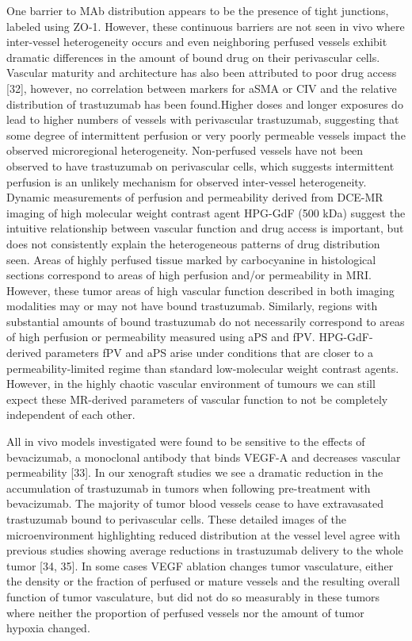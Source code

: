 One barrier to MAb distribution appears to be the presence of tight junctions, labeled using ZO-1.
However, these continuous barriers are not seen in vivo where inter-vessel heterogeneity occurs and even neighboring perfused vessels exhibit dramatic differences in the amount of bound drug on their perivascular cells.
Vascular maturity and architecture has also been attributed to poor drug access [32], however, no correlation between markers for aSMA or CIV and the relative distribution of trastuzumab has been found.Higher doses and longer exposures do lead to higher numbers of vessels with perivascular trastuzumab, suggesting that some degree of intermittent perfusion or very poorly permeable vessels impact the observed microregional heterogeneity.
Non-perfused vessels have not been observed to have trastuzumab on perivascular cells, which suggests intermittent perfusion is an unlikely mechanism for observed inter-vessel heterogeneity.
Dynamic measurements of perfusion and permeability derived from DCE-MR imaging of high molecular weight contrast agent HPG-GdF (500 kDa) suggest the intuitive relationship between vascular function and drug access is important, but does not consistently explain the heterogeneous patterns of drug distribution seen.
Areas of highly perfused tissue marked by carbocyanine in histological sections correspond to areas of high perfusion and/or permeability in MRI.
However, these tumor areas of high vascular function described in both imaging modalities may or may not have bound trastuzumab.
Similarly, regions with substantial amounts of bound trastuzumab do not necessarily correspond to areas of high perfusion or permeability measured using aPS and fPV.
HPG-GdF-derived parameters fPV and aPS arise under conditions that are closer to a permeability-limited regime than standard low-molecular weight contrast agents.
However, in the highly chaotic vascular environment of tumours we can still expect these MR-derived parameters of vascular function to not be completely independent of each other.

All in vivo models investigated were found to be sensitive to the effects of bevacizumab, a monoclonal antibody that binds VEGF-A and decreases vascular permeability [33].
In our xenograft studies we see a dramatic reduction in the accumulation of trastuzumab in tumors when following pre-treatment with bevacizumab.
The majority of tumor blood vessels cease to have extravasated trastuzumab bound to perivascular cells.
These detailed images of the microenvironment highlighting reduced distribution at the vessel level agree with previous studies showing average reductions in trastuzumab delivery to the whole tumor [34, 35].
In some cases VEGF ablation changes tumor vasculature, either the density or the fraction of perfused or mature vessels and the resulting overall function of tumor vasculature, but did not do so measurably in these tumors where neither the proportion of perfused vessels nor the amount of tumor hypoxia changed.


